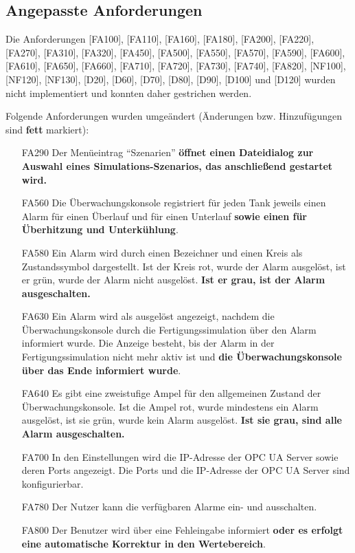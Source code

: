 \documentclass[parskip=full]{scrartcl}
\begin{document}
\subsection{Angepasste Anforderungen}
Die Anforderungen [FA100], [FA110], [FA160], [FA180], [FA200], [FA220], [FA270], [FA310], [FA320], [FA450], [FA500], [FA550], [FA570], [FA590], [FA600], [FA610], [FA650], [FA660], [FA710], [FA720], [FA730], [FA740], [FA820], [NF100], [NF120], [NF130], [D20], [D60], [D70], [D80], [D90], [D100] und [D120] wurden nicht implementiert und konnten daher gestrichen werden.

Folgende Anforderungen wurden umgeändert (Änderungen bzw. Hinzufügungen sind \textbf{fett} markiert):
\begin{enumerate}
	\item[FA290] Der Menüeintrag "`Szenarien"' \textbf{öffnet einen Dateidialog zur Auswahl eines Simulations-Szenarios, das anschließend gestartet wird.}
	\item[FA560] Die Überwachungskonsole registriert für jeden Tank jeweils einen Alarm für einen Überlauf und für einen Unterlauf \textbf{sowie einen für Überhitzung und Unterkühlung}.
	\item[FA580] Ein Alarm wird durch einen Bezeichner und einen Kreis als Zustandssymbol dargestellt. Ist der Kreis rot, wurde der Alarm ausgelöst, ist er grün, wurde der Alarm nicht ausgelöst. \textbf{Ist er grau, ist der Alarm ausgeschalten.}
	\item[FA630] Ein Alarm wird als ausgelöst angezeigt, nachdem die Überwachungskonsole durch die Fertigungssimulation über den Alarm informiert wurde. Die Anzeige besteht, bis der Alarm in der Fertigungssimulation nicht mehr aktiv ist und \textbf{die Überwachungskonsole über das Ende informiert wurde}.
	\item[FA640] Es gibt eine zweistufige Ampel für den allgemeinen Zustand der Überwachungskonsole. Ist die Ampel rot, wurde mindestens ein Alarm ausgelöst, ist sie grün, wurde kein Alarm ausgelöst. \textbf{Ist sie grau, sind alle Alarm ausgeschalten.}
	\item[FA700] In den Einstellungen wird die IP-Adresse der OPC UA Server sowie deren Ports angezeigt. Die Ports und die IP-Adresse der OPC UA Server sind konfigurierbar.
	\item[FA780] Der Nutzer kann die verfügbaren Alarme ein- und ausschalten.
	\item[FA800] Der Benutzer wird über eine Fehleingabe informiert \textbf{oder es erfolgt eine automatische Korrektur in den Wertebereich}.

\end{enumerate}
\end{document}
